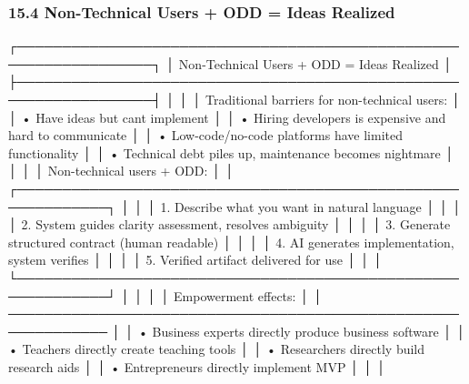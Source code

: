 \documentclass[
]{article}
\newenvironment{Shaded}{}{}
\newcommand{\NormalTok}[1]{#1}
\begin{document}
\hypertarget{154-non-technical-users-+-odd-=-ideas-realized}{%
\subsubsection{15.4 Non-Technical Users + ODD = Ideas
Realized}\label{154-non-technical-users-+-odd-=-ideas-realized}}

\begin{Shaded}
\begin{Highlighting}[]
\NormalTok{┌─────────────────────────────────────────────────────────────────┐}
\NormalTok{│           Non{-}Technical Users + ODD = Ideas Realized             │}
\NormalTok{├─────────────────────────────────────────────────────────────────┤}
\NormalTok{│                                                                  │}
\NormalTok{│  Traditional barriers for non{-}technical users:                  │}
\NormalTok{│  • Have ideas but can\textquotesingle{}t implement                               │}
\NormalTok{│  • Hiring developers is expensive and hard to communicate       │}
\NormalTok{│  • Low{-}code/no{-}code platforms have limited functionality        │}
\NormalTok{│  • Technical debt piles up, maintenance becomes nightmare       │}
\NormalTok{│                                                                  │}
\NormalTok{│  Non{-}technical users + ODD:                                     │}
\NormalTok{│  ┌────────────────────────────────────────────────────────────┐ │}
\NormalTok{│  │  1. Describe what you want in natural language             │ │}
\NormalTok{│  │  2. System guides clarity assessment, resolves ambiguity   │ │}
\NormalTok{│  │  3. Generate structured contract (human readable)          │ │}
\NormalTok{│  │  4. AI generates implementation, system verifies           │ │}
\NormalTok{│  │  5. Verified artifact delivered for use                    │ │}
\NormalTok{│  └────────────────────────────────────────────────────────────┘ │}
\NormalTok{│                                                                  │}
\NormalTok{│  Empowerment effects:                                           │}
\NormalTok{│  ─────────────────────────────────────────────────────────────  │}
\NormalTok{│  • Business experts directly produce business software          │}
\NormalTok{│  • Teachers directly create teaching tools                      │}
\NormalTok{│  • Researchers directly build research aids                     │}
\NormalTok{│  • Entrepreneurs directly implement MVP                         │}
\NormalTok{│                                                                  │}

\end{Highlighting}
\end{Shaded}
\end{document}
